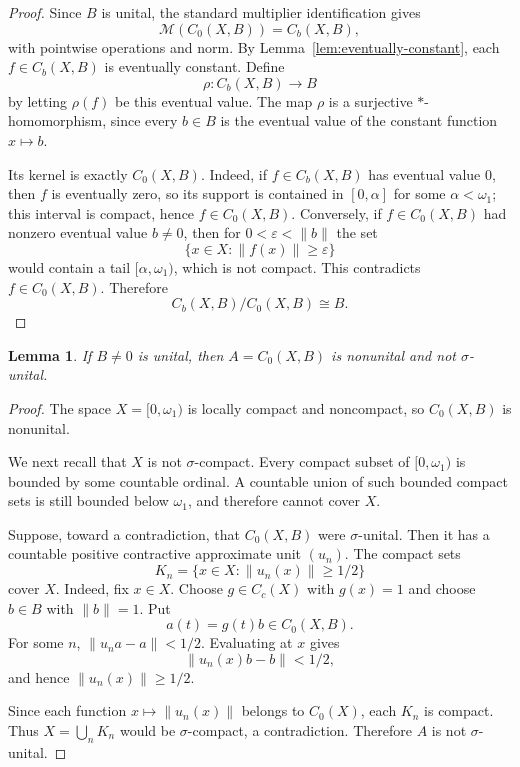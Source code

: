\documentclass[11pt]{article}
\newtheorem{lemma}{Lemma}
\newcommand{\M}{\mathcal M}
\begin{document}
\begin{proof}
Since \(B\) is unital, the standard multiplier identification gives
\[
        \M(C_0(X,B))=C_b(X,B),
\]
with pointwise operations and norm.  By Lemma~\ref{lem:eventually-constant},
each \(f\in C_b(X,B)\) is eventually constant.  Define
\[
        \rho:C_b(X,B)\longrightarrow B
\]
by letting \(\rho(f)\) be this eventual value.  The map \(\rho\) is a
surjective \(*\)-homomorphism, since every \(b\in B\) is the eventual value of
the constant function \(x\mapsto b\).

Its kernel is exactly \(C_0(X,B)\).  Indeed, if \(f\in C_b(X,B)\) has eventual
value \(0\), then \(f\) is eventually zero, so its support is contained in
\([0,\alpha]\) for some \(\alpha<\omega_1\); this interval is compact, hence
\(f\in C_0(X,B)\).  Conversely, if \(f\in C_0(X,B)\) had nonzero eventual value
\(b\ne0\), then for \(0<\varepsilon<\|b\|\) the set
\[
        \{x\in X:\|f(x)\|\ge\varepsilon\}
\]
would contain a tail \([\alpha,\omega_1)\), which is not compact.  This
contradicts \(f\in C_0(X,B)\).  Therefore
\[
        C_b(X,B)/C_0(X,B)\cong B.
\]
\end{proof}

\begin{lemma}
\label{lem:not-sigma-unital}
If \(B\ne0\) is unital, then \(A=C_0(X,B)\) is nonunital and not
\(\sigma\)-unital.
\end{lemma}

\begin{proof}
The space \(X=[0,\omega_1)\) is locally compact and noncompact, so
\(C_0(X,B)\) is nonunital.

We next recall that \(X\) is not \(\sigma\)-compact.  Every compact subset of
\([0,\omega_1)\) is bounded by some countable ordinal.  A countable union of
such bounded compact sets is still bounded below \(\omega_1\), and therefore
cannot cover \(X\).

Suppose, toward a contradiction, that \(C_0(X,B)\) were \(\sigma\)-unital.
Then it has a countable positive contractive approximate unit \((u_n)\).  The
compact sets
\[
        K_n=\{x\in X: \|u_n(x)\|\ge 1/2\}
\]
cover \(X\).  Indeed, fix \(x\in X\).  Choose \(g\in C_c(X)\) with
\(g(x)=1\) and choose \(b\in B\) with \(\|b\|=1\).  Put
\[
        a(t)=g(t)b\in C_0(X,B).
\]
For some \(n\), \(\|u_na-a\|<1/2\).  Evaluating at \(x\) gives
\[
        \|u_n(x)b-b\|<1/2,
\]
and hence \(\|u_n(x)\|\ge1/2\).

Since each function \(x\mapsto\|u_n(x)\|\) belongs to \(C_0(X)\), each
\(K_n\) is compact.  Thus \(X=\bigcup_n K_n\) would be \(\sigma\)-compact, a
contradiction.  Therefore \(A\) is not \(\sigma\)-unital.
\end{proof}
\end{document}
